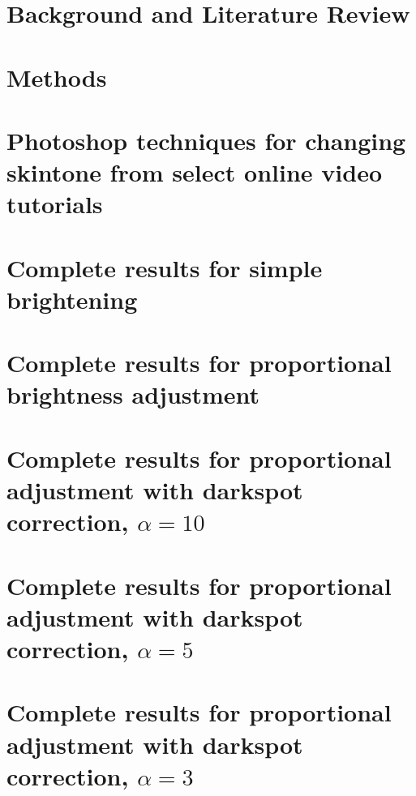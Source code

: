 \documentclass[12pt, a4paper]{article}
\begin{document}
\tableofcontents
\pagebreak

\listoffigures
\listoftables
\pagebreak

\section{Background and Literature Review}

\pagebreak

\section{Methods}

\pagebreak



\pagebreak

\appendix

\section{Photoshop techniques for changing skintone from select online video tutorials}\label{app:photoshop}


\pagebreak

\section{Complete results for simple brightening}\label{app:boost}

\pagebreak

\section{Complete results for proportional brightness adjustment}\label{app:prop}

\pagebreak

\section{Complete results for proportional adjustment with darkspot correction, $\alpha = 10$}\label{app:prop_corr_a10}

\pagebreak

\section{Complete results for proportional adjustment with darkspot correction, $\alpha = 5$}\label{app:prop_corr_a5}

\pagebreak

\section{Complete results for proportional adjustment with darkspot correction, $\alpha = 3$}\label{app:prop_corr_a3}

\end{document}

